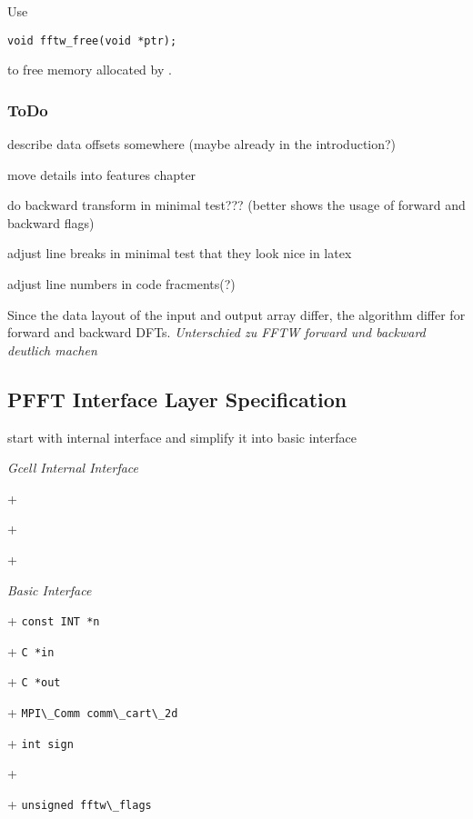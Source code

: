 Use
\begin{lstlisting}
void fftw_free(void *ptr);
\end{lstlisting}
to free memory allocated by .

\subsubsection*{ToDo}
\begin{compactitem}
  \item describe data offsets somewhere (maybe already in the introduction?)
  \item move details into features chapter
  \item do backward transform in minimal test??? (better shows the usage of forward and backward flags)
  \item adjust line breaks in minimal test that they look nice in latex
  \item adjust line numbers in code fracments(?)
\end{compactitem}

Since the data layout of the input and output array differ, the algorithm differ for forward and backward
DFTs. \emph{Unterschied zu FFTW forward und backward deutlich machen}








\newpage
\subsection{PFFT Interface Layer Specification}
\begin{compactitem}
  \myitem start with internal interface and simplify it into basic interface
\end{compactitem}


\emph{Gcell Internal Interface}
\begin{compactitem}
  \item[+] \verb++
  \item[+] \verb++
  \item[+] \verb++
\end{compactitem}




\emph{Basic Interface}
\begin{compactitem}
  \item[+] \verb+const INT *n+
  \item[+] \verb+C *in+
  \item[+] \verb+C *out+
  \item[+] \verb+MPI\_Comm comm\_cart\_2d+
  \item[+] \verb+int sign+
  \item[+] 
  \item[+] \verb+unsigned fftw\_flags+
\end{compactitem}

